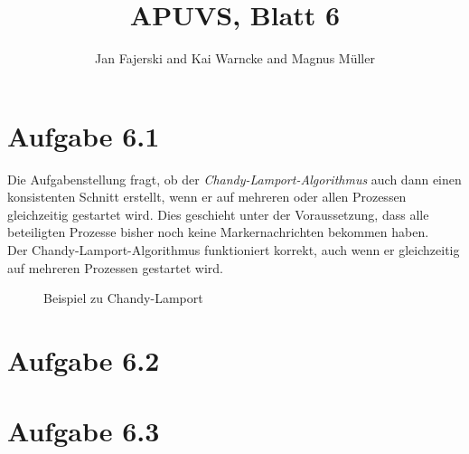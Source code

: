 \documentclass[a4paper,
12pt,
BCOR12mm,
]{scrartcl}
\title{APUVS, Blatt 6}
\author{Jan Fajerski and Kai Warncke and Magnus Müller}
\begin{document}

\maketitle 

\section*{Aufgabe 6.1}
Die Aufgabenstellung fragt, ob der \emph{Chandy-Lamport-Algorithmus} auch dann einen
konsistenten Schnitt erstellt, wenn er auf mehreren oder allen Prozessen gleichzeitig
gestartet wird. Dies geschieht unter der Voraussetzung, dass alle beteiligten Prozesse
bisher noch keine Markernachrichten bekommen haben. \\

Der Chandy-Lamport-Algorithmus funktioniert korrekt, auch wenn er gleichzeitig auf
mehreren Prozessen gestartet wird. \\

\begin{figure}[ht!]
  \begin{center}
  \end{center}
  \caption{Beispiel zu Chandy-Lamport}
  \label{fig:example}
\end{figure}

\section*{Aufgabe 6.2}

\section*{Aufgabe 6.3}
\end{document}
